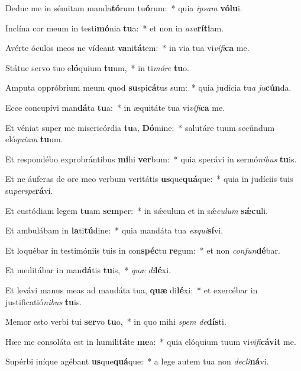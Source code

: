 \item Deduc me in sémitam manda\textbf{tó}rum tu\textbf{ó}rum:~* quia \textit{ip}\textit{sam} \textbf{vó}\textbf{lu}i.
\item Inclína cor meum in testi\textbf{mó}nia \textbf{tu}a:~* et non in \textit{a}\textit{va}\textbf{rí}\textbf{ti}am.
\item Avérte óculos meos ne vídeant \textbf{va}ni\textbf{tá}tem:~* in via tua vi\textit{ví}\textit{fi}\textbf{ca} me.
\item Státue servo tuo e\textbf{ló}quium \textbf{tu}um,~* in ti\textit{mó}\textit{re} \textbf{tu}o.
\item Amputa oppróbrium meum quod \textbf{su}spi\textbf{cá}tus sum:~* quia judícia tu\textit{a} \textit{ju}\textbf{cún}da.
\item Ecce concupívi man\textbf{dá}ta \textbf{tu}a:~* in æquitáte tua vi\textit{ví}\textit{fi}\textbf{ca} me.
\item Et véniat super me misericórdia \textbf{tu}a, \textbf{Dó}mine:~* salutáre tuum secúndum eló\textit{qui}\textit{um} \textbf{tu}um.
\item Et respondébo exprobrántibus \textbf{mi}hi \textbf{ver}bum:~* quia sperávi in sermó\textit{ni}\textit{bus} \textbf{tu}is.
\item Et ne áuferas de ore meo verbum veritátis \textbf{us}que\textbf{quá}que:~* quia in judíciis tuis su\textit{per}\textit{spe}\textbf{rá}vi.
\item Et custódiam legem \textbf{tu}am \textbf{sem}per:~* in sǽculum et in sǽ\textit{cu}\textit{lum} \textbf{sǽ}\textbf{cu}li.
\item Et ambulábam in \textbf{la}ti\textbf{tú}dine:~* quia mandáta tua \textit{ex}\textit{qui}\textbf{sí}vi.
\item Et loquébar in testimóniis tuis in con\textbf{spéc}tu \textbf{re}gum:~* et non \textit{con}\textit{fun}\textbf{dé}bar.
\item Et meditábar in man\textbf{dá}tis \textbf{tu}is,~* \textit{quæ} \textit{di}\textbf{lé}xi.
\item Et levávi manus meas ad mandáta tua, \textbf{quæ} di\textbf{lé}xi:~* et exercébar in justificatió\textit{ni}\textit{bus} \textbf{tu}is.
\item Memor esto verbi tui \textbf{ser}vo \textbf{tu}o,~* in quo mihi \textit{spem} \textit{de}\textbf{dís}ti.
\item Hæc me consoláta est in humili\textbf{tá}te \textbf{me}a:~* quia elóquium tuum vi\textit{vi}\textit{fi}\textbf{cá}\textbf{vit} me.
\item Supérbi iníque agébant \textbf{us}que\textbf{quá}que:~* a lege autem tua non \textit{de}\textit{cli}\textbf{ná}vi.

